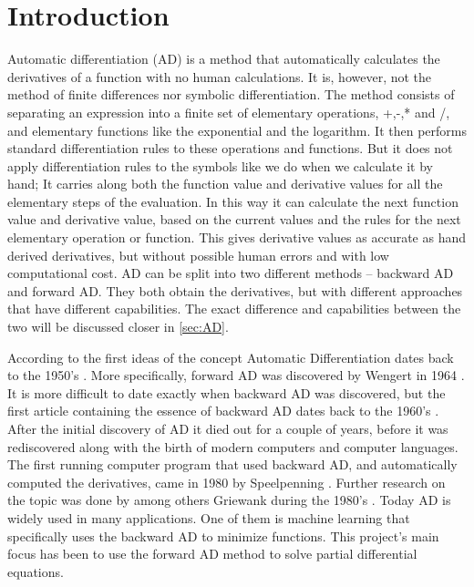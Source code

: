 \chapter{Introduction}
Automatic differentiation (AD) is a method that automatically calculates the derivatives of a function with no human calculations. It is, however, not the method of finite differences nor symbolic differentiation. The method consists of separating an expression into a finite set of elementary operations, +,-,* and /, and elementary functions like the exponential and the logarithm. It then performs standard differentiation rules to these operations and functions. But it does not apply differentiation rules to the symbols like we do when we calculate it by hand; It carries along both the function value and derivative values for all the elementary steps of the evaluation. In this way it can calculate the next function value and derivative value, based on the current values and the rules for the next elementary operation or function. This gives derivative values as accurate as hand derived derivatives, but without possible human errors and with low computational cost. AD can be split into two different methods -- backward AD and forward AD. They both obtain the derivatives, but with different approaches that have different capabilities. The exact difference and capabilities between the two will be discussed closer in \autoref{sec:AD}. 

According to \emph{\cite{SurveyAD}} the first ideas of the concept Automatic Differentiation dates back to the 1950's \emph{\citep{nolan1953analytical, beda1959programs}}. More specifically, forward AD was discovered by Wengert in 1964 \emph{\citep{wengert1964simple}}. It is more difficult to date exactly when backward AD was discovered, but the first article containing the essence of backward AD dates back to the 1960's \emph{\citep{boltyanskii1960theory}}. After the initial discovery of AD it died out for a couple of years, before it was rediscovered along with the birth of modern computers and computer languages. The first running computer program that used backward AD, and automatically computed the derivatives, came in 1980 by Speelpenning \emph{\citep{speelpenning1980compiling}}. Further research on the topic was done by among others Griewank during the 1980's \emph{\citep{griewank1989automatic}}. Today AD is widely used in many applications. One of them is machine learning that specifically uses the backward AD to minimize functions. This project's main focus has been to use the forward AD method to solve partial differential equations. 


